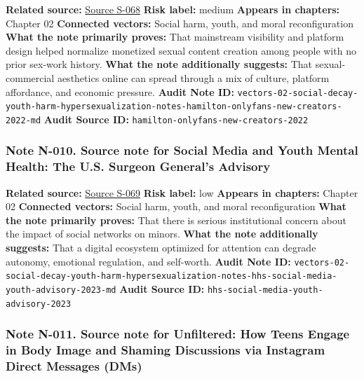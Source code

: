 \documentclass[
  american,
  11pt,
  letterpaper,
]{article}
\begin{document}
\textbf{Related source:}
\hyperref[source-s-068-nudes-shouldn-t-i-charge-for-these-motivations-of-new-sexual-content-creators-on-onlyfans]{Source
S-068} \textbf{Risk label:} medium \textbf{Appears in chapters:} Chapter
02 \textbf{Connected vectors:} Social harm, youth, and moral
reconfiguration \textbf{What the note primarily proves:} That mainstream
visibility and platform design helped normalize monetized sexual content
creation among people with no prior sex-work history. \textbf{What the
note additionally suggests:} That sexual-commercial aesthetics online
can spread through a mix of culture, platform affordance, and economic
pressure. \textbf{Audit Note ID:}
\texttt{vectors-02-social-decay-youth-harm-hypersexualization-notes-hamilton-onlyfans-new-creators-2022-md}
\textbf{Audit Source ID:} \texttt{hamilton-onlyfans-new-creators-2022}

\subsubsection{Note N-010. Source note for Social Media and Youth Mental
Health: The U.S. Surgeon General's
Advisory}\label{note-n-010-vectors-02-social-decay-youth-harm-hypersexualization-notes-hhs-social-media-youth-advisory-2023-md}

\textbf{Related source:}
\hyperref[source-s-069-social-media-and-youth-mental-health-the-u-s-surgeon-general-s-advisory]{Source
S-069} \textbf{Risk label:} low \textbf{Appears in chapters:} Chapter 02
\textbf{Connected vectors:} Social harm, youth, and moral
reconfiguration \textbf{What the note primarily proves:} That there is
serious institutional concern about the impact of social networks on
minors. \textbf{What the note additionally suggests:} That a digital
ecosystem optimized for attention can degrade autonomy, emotional
regulation, and self-worth. \textbf{Audit Note ID:}
\texttt{vectors-02-social-decay-youth-harm-hypersexualization-notes-hhs-social-media-youth-advisory-2023-md}
\textbf{Audit Source ID:} \texttt{hhs-social-media-youth-advisory-2023}

\subsubsection{Note N-011. Source note for Unfiltered: How Teens Engage
in Body Image and Shaming Discussions via Instagram Direct Messages
(DMs)}\label{note-n-011-vectors-02-social-decay-youth-harm-hypersexualization-notes-instagram-body-image-dms-2025-md}
\end{document}
